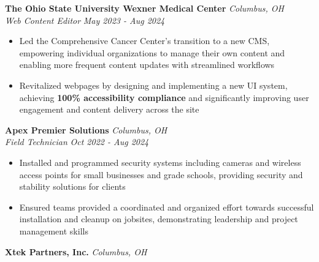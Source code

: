\documentclass[letterpaper]{article}
\newenvironment{tightitemize}{%
  \begin{itemize}\small\setlength{\baselineskip}{0.95\baselineskip}\itemsep -1mm%
}{\end{itemize}}
\begin{document}
    \textbf{The Ohio State University Wexner Medical Center} \hfill \textsl{Columbus, OH}\\
    
    \textit{Web Content Editor} \hfill \textsl{May 2023 - Aug 2024}\\
    \vspace{-7pt}
    \begin{tightitemize} \itemsep -1mm
        
            \item Led the Comprehensive Cancer Center's transition to a new CMS, empowering individual organizations to manage their own content and enabling more frequent content updates with streamlined workflows
            
            \item Revitalized webpages by designing and implementing a new UI system, achieving \textbf{100\% accessibility compliance} and significantly improving user engagement and content delivery across the site

    \end{tightitemize}
    \vspace{-2mm}

    \textbf{Apex Premier Solutions} \hfill \textsl{Columbus, OH}\\
    
    \textit{Field Technician} \hfill \textsl{Oct 2022 - Aug 2024}\\
    \vspace{-7pt}
    \begin{tightitemize} \itemsep -1mm
        
            \item Installed and programmed security systems including cameras and wireless access points for small businesses and grade schools, providing security and stability solutions for clients
            
            \item Ensured teams provided a coordinated and organized effort towards successful installation and cleanup on jobsites, demonstrating leadership and project management skills

    \end{tightitemize}
    \vspace{-2mm}

    \textbf{Xtek Partners, Inc.} \hfill \textsl{Columbus, OH}\\
    
\end{document}
